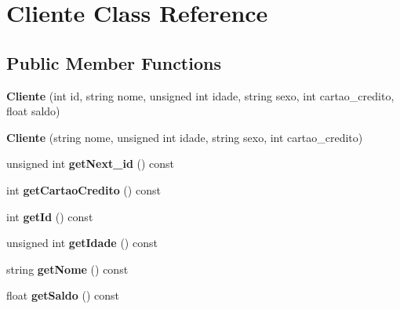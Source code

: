 \hypertarget{class_cliente}{\section{Cliente Class Reference}
\label{class_cliente}
}
\subsection*{Public Member Functions}
\begin{DoxyCompactItemize}
\item 
\hypertarget{class_cliente_a99ac44054f87483cbaaecd3e88477892}{{\bfseries Cliente} (int id, string nome, unsigned int idade, string sexo, int cartao\+\_\+credito, float saldo)}\label{class_cliente_a99ac44054f87483cbaaecd3e88477892}

\item 
\hypertarget{class_cliente_abcfd18678847f314549baa4ac66fbd1a}{{\bfseries Cliente} (string nome, unsigned int idade, string sexo, int cartao\+\_\+credito)}\label{class_cliente_abcfd18678847f314549baa4ac66fbd1a}

\item 
\hypertarget{class_cliente_af76bd3dca7cc6a21f94ee57c06de4427}{unsigned int {\bfseries get\+Next\+\_\+id} () const }\label{class_cliente_af76bd3dca7cc6a21f94ee57c06de4427}

\item 
\hypertarget{class_cliente_a9303d7e564ead678ba2bcb13157524a5}{int {\bfseries get\+Cartao\+Credito} () const }\label{class_cliente_a9303d7e564ead678ba2bcb13157524a5}

\item 
\hypertarget{class_cliente_a57130129d927bb9e777ccdecb8918db4}{int {\bfseries get\+Id} () const }\label{class_cliente_a57130129d927bb9e777ccdecb8918db4}

\item 
\hypertarget{class_cliente_ac182c452fcf4daac306280f707b16992}{unsigned int {\bfseries get\+Idade} () const }\label{class_cliente_ac182c452fcf4daac306280f707b16992}

\item 
\hypertarget{class_cliente_a0325de899469e2fed48ffda2b5b291cf}{string {\bfseries get\+Nome} () const }\label{class_cliente_a0325de899469e2fed48ffda2b5b291cf}

\item 
\hypertarget{class_cliente_ac91943541afd55e1b8e7d3139197b3b0}{float {\bfseries get\+Saldo} () const }\label{class_cliente_ac91943541afd55e1b8e7d3139197b3b0}


\end{DoxyCompactItemize}
